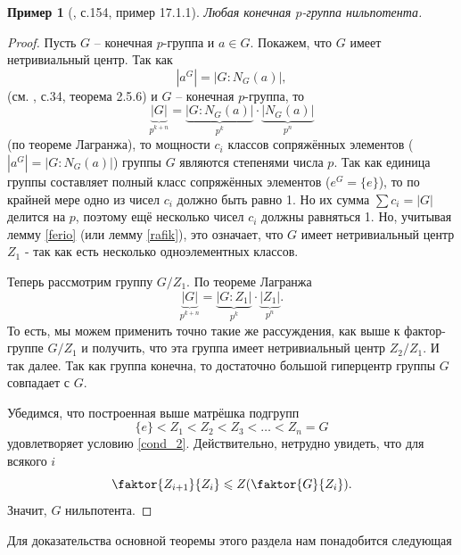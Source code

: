 \documentclass{article}
\newtheorem{example}{Пример}[section]
\begin{document}
\begin{example} [\cite{kargapolov}, с.154, пример 17.1.1] \label{uganda}
    Любая конечная $p$-группа нильпотента.
\end{example}
\begin{proof} 
    Пусть $G$ -- конечная $p$-группа и $a \in G$. Покажем, что $G$ имеет нетривиальный центр. Так как
    \[
        |a^G| = |G : N_G(a)|,
    \]
    (см. \cite{kargapolov}, с.34, теорема 2.5.6) и $G$ -- конечная $p$-группа, то $$ \underbrace{|G|}_{p^{k + n}} = \underbrace{|G : N_G(a)|}_{p^k} \cdot \underbrace{|N_G(a)|}_{p^n} $$ (по теореме Лагранжа), то мощности $c_i$ классов сопряжённых элементов ($|a^G| = |G:N_G(a)|$) группы $G$ являются степенями числа $p$. Так как единица группы составляет полный класс сопряжённых элементов ($e^G = \{ e \}$), то по крайней мере одно из чисел $c_i$ должно быть равно 1. Но их сумма $\sum c_i = |G|$ делится на $p$, поэтому ещё несколько чисел $c_i$ должны равняться 1. Но, учитывая лемму \ref{ferio} (или лемму \ref{rafik}), это означает, что $G$ имеет нетривиальный центр $Z_1$ - так как есть несколько одноэлементных классов.

    Теперь рассмотрим группу $G/Z_1$. По теореме Лагранжа
    \[
        \underbrace{|G|}_{p^{k + n}} = \underbrace{|G:Z_1|}_{p^k} \cdot \underbrace{|Z_1|}_{p^n}.
    \]
    То есть, мы можем применить точно такие же рассуждения, как выше к фактор-группе $G/Z_1$ и получить, что эта группа имеет нетривиальный центр $Z_2/Z_1$. И так далее. Так как группа конечна, то достаточно большой гиперцентр группы $G$ совпадает с $G$.
    
    Убедимся, что построенная выше матрёшка подгрупп
    \[
        \{e\} < Z_1 < Z_2 < Z_3 < \ldots < Z_n = G
    \]
    удовлетворяет условию \eqref{cond_2}. Действительно, нетрудно увидеть, что для всякого $i$
    \[
        \faktor{Z_{i + 1}}{Z_i} \leqslant Z(\faktor{G}{Z_i}).
    \] Значит, $G$ нильпотента.
\end{proof}

Для доказательства основной теоремы этого раздела нам понадобится следующая
\end{document}
